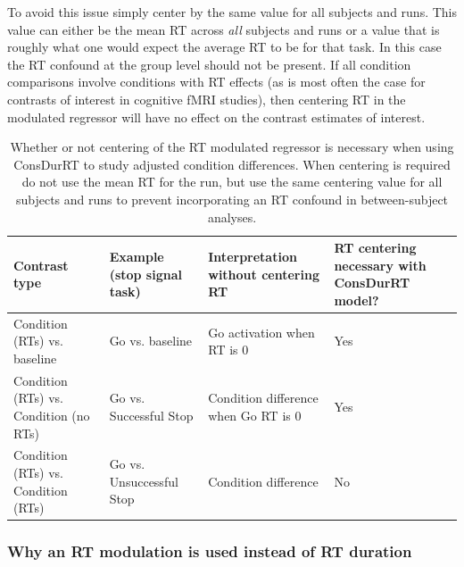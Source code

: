 \documentclass[titlepage,12pt] {article}
\begin{document}
To avoid this issue simply center by the same value for all subjects and runs.  This value can either be the mean RT across \emph{all} subjects and runs or a value that is roughly what one would expect the average RT to be for that task.  In this case the RT confound at the group level should not be present.  If all condition comparisons involve conditions with RT effects (as is most often the case for contrasts of interest in cognitive fMRI studies), then centering RT in the modulated regressor will have no effect on the contrast estimates of interest.

\begin{table}[h!]
  \begin{center}
   \begin{tabular}{|L{4cm}|L{3.25cm}|L{3.9cm}|L{3.7cm}|} \hline
      Contrast type & Example  \newline (stop signal task) & Interpretation without centering RT & RT centering necessary with ConsDurRT model? \\ \hline\hline
      Condition (RTs) vs. baseline & Go  vs. \newline baseline & Go activation when RT is 0 & Yes \\ \hline
      Condition (RTs) vs. Condition (no RTs) & Go vs. \newline  Successful Stop  & Condition difference when Go RT is 0 & Yes \\ \hline
      Condition (RTs) vs. Condition (RTs) & Go vs. \newline  Unsuccessful Stop & Condition difference & No \\ \hline
    \end{tabular}
        \caption{Whether or not centering of the RT modulated regressor is necessary when using ConsDurRT to study adjusted condition differences.  When centering is required do not use the mean RT for the run, but use the same centering value for all subjects and runs to prevent incorporating an RT confound in between-subject analyses.}\label{tab:centering-rt}
   \end{center}
 \end{table}


\subsubsection*{Why an RT modulation is used instead of RT duration}
\end{document}
